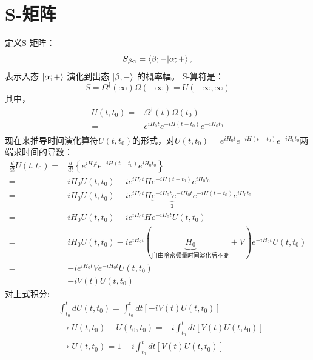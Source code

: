 \newpage
\section{S-矩阵}
定义S-矩阵：
    \begin{equation}
    S_{\beta\alpha} = \braket{\beta;- | \alpha;+},
\end{equation}
表示入态 $\ket{\alpha;+}$ 演化到出态 $\ket{\beta;-}$ 的概率幅。
S-算符是：
\begin{equation}
    S=\Omega^\dagger(\infty)\Omega(-\infty)=U(-\infty,\infty)
\end{equation}
其中，
\begin{equation}\label{5.5.2}
   \begin{aligned}
    U(t,t_0)=&\Omega^\dagger(t)\Omega(t_0)\\
    =&e^{iH_0t}e^{-iH(t-t_0)}e^{-iH_0t_0}\\
   \end{aligned}
\end{equation}
现在来推导时间演化算符$U(t,t_0)$的形式，对$U(t,t_0)=e^{iH_0t}e^{-iH(t-t_0)}e^{-iH_0t_0}$两端求时间的导数：
\begin{equation*}
        \begin{aligned}
        \frac{d}{dt}U(t,t_0)=&\frac{d}{dt}\left\{e^{iH_0t}e^{-iH(t-t_0)}e^{iH_0t_0}\right\}\\
        =&iH_0U(t,t_0)-ie^{iH_0t}He^{-iH(t-t_0)}e^{iH_0t_0}\\
        =&iH_0U(t,t_0)-ie^{iH_0t}H\underbrace{e^{-iH_0t}e^{-iH_0t}}_{\mathbf{1}}e^{-iH(t-t_0)}e^{iH_0t_0}\\
        =&iH_0U(t,t_0)-ie^{iH_0t}He^{-iH_0t}U(t,t_0)\\
        =&iH_0U(t,t_0)-ie^{iH_0t}(\underbrace{H_0}_\text{自由哈密顿量时间演化后不变}+V)e^{-iH_0t}U(t,t_0)\\
        =&-ie^{iH_0t}Ve^{-iH_0t}U(t,t_0)\\
        =&-iV(t)U(t,t_0)
    \end{aligned}
\end{equation*}
对上式积分:
\begin{equation*}
    \begin{aligned}
        &\int^{t}_{t_0}dU(t,t_0)=\int^{t}_{t_0}dt\left[-iV(t)U(t,t_0)\right]\\
        &\rightarrow U(t,t_0)-U(t_0,t_0)=-i\int^{t}_{t_0}dt\left[V(t)U(t,t_0)\right]\\
        &\rightarrow U(t,t_0)=1-i\int^{t}_{t_0}dt\left[V(t)U(t,t_0)\right]\\
    \end{aligned}
\end{equation*}
